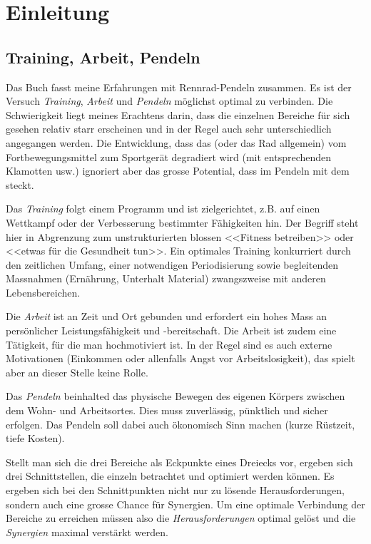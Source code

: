 \chapter{Einleitung}


\section{Training, Arbeit, Pendeln}

Das Buch fasst meine Erfahrungen mit Rennrad-Pendeln zusammen.
Es ist der Versuch \emph{Training}, \emph{Arbeit} und \emph{Pendeln} möglichst optimal zu verbinden.
Die Schwierigkeit liegt meines Erachtens darin, dass die einzelnen Bereiche für sich gesehen relativ starr erscheinen
und in der Regel auch sehr unterschiedlich angegangen werden.
Die Entwicklung, dass das \rv (oder das Rad allgemein) vom Fortbewegungsmittel zum Sportgerät degradiert wird
(mit entsprechenden Klamotten usw.) ignoriert aber das grosse Potential, dass im Pendeln mit dem \rv steckt.

Das \emph{Training} folgt einem Programm und ist zielgerichtet, z.B. auf einen
Wettkampf oder der Verbesserung bestimmter Fähigkeiten hin.
Der Begriff steht hier in Abgrenzung zum unstrukturierten blossen <<Fitness betreiben>> oder <<etwas für die Gesundheit tun>>.
Ein optimales Training konkurriert durch den zeitlichen Umfang, einer notwendigen Periodisierung sowie
begleitenden Massnahmen (Ernährung, Unterhalt Material) zwangszweise mit anderen Lebensbereichen.

Die \emph{Arbeit} ist an Zeit und Ort gebunden und erfordert ein hohes Mass an persönlicher Leistungsfähigkeit und -bereitschaft.
Die Arbeit ist zudem eine Tätigkeit, für die man hochmotiviert ist.
In der Regel sind es auch externe Motivationen (Einkommen oder allenfalls Angst vor Arbeitslosigkeit),
das spielt aber an dieser Stelle keine Rolle.

Das \emph{Pendeln} beinhalted das physische Bewegen des eigenen Körpers zwischen dem Wohn- und Arbeitsortes.
Dies muss zuverlässig, pünktlich und sicher erfolgen.
Das Pendeln soll dabei auch ökonomisch Sinn machen (kurze Rüstzeit, tiefe Kosten).

Stellt man sich die drei Bereiche als Eckpunkte eines Dreiecks vor, ergeben sich drei Schnittstellen,
die einzeln betrachtet und optimiert werden können.
Es ergeben sich bei den Schnittpunkten nicht nur zu lösende Herausforderungen,
sondern auch eine grosse Chance für Synergien.
Um eine optimale Verbindung der Bereiche zu erreichen müssen also die \emph{Herausforderungen} optimal gelöst
und die \emph{Synergien} maximal verstärkt werden.

